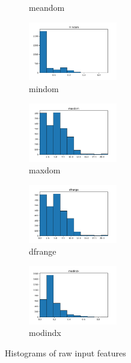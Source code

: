 \documentclass[a4paper]{article}
\begin{document}
\begin{figure}
\begin{subfigure}{0.32\textwidth}
        \caption{meandom}
        \label{fig:sub_raw_15}
    \end{subfigure}\hfill
    \begin{subfigure}{0.32\textwidth}
        \centering
        \includegraphics[width=3.85cm]{raw_15_mindom}
        \caption{mindom}
        \label{fig:sub_raw_16}
    \end{subfigure}\hfill
    \begin{subfigure}{0.32\textwidth}
        \centering
        \includegraphics[width=3.85cm]{raw_16_maxdom}
        \caption{maxdom}
        \label{fig:sub_raw_17}
    \end{subfigure}\hfill
    \begin{subfigure}{0.32\textwidth}
        \centering
        \includegraphics[width=3.85cm]{raw_17_dfrange}
        \caption{dfrange}
        \label{fig:sub_raw_18}
    \end{subfigure}\hfill
    \begin{subfigure}{0.32\textwidth}
        \centering
        \includegraphics[width=3.85cm]{raw_18_modindx}
        \caption{modindx}
        \label{fig:sub_raw_19}
    \end{subfigure}
    \caption{Histograms of raw input features}
    \label{fig:pre-ex1-raw_histograms}
\end{figure}
\end{document}
